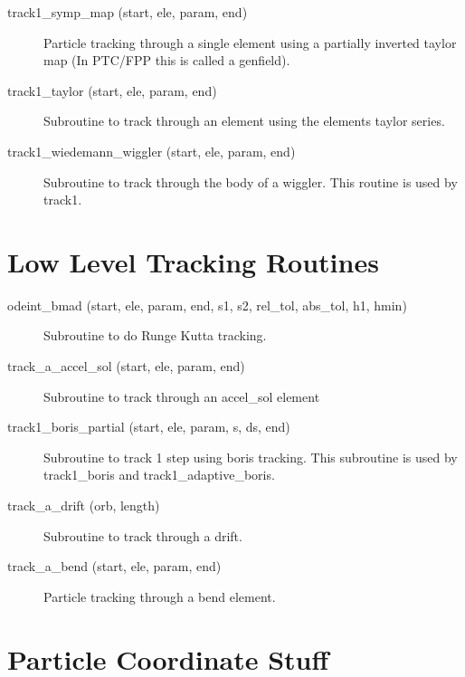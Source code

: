 \begin{description}
\item[track1\_symp\_map (start, ele, param, end)] \Newline
Particle tracking through a single element using a partially inverted taylor map (In PTC/FPP this is called a genfield). 

\item[track1\_taylor (start, ele, param, end)] \Newline
Subroutine to track through an element using the elements taylor series. 

\item[track1\_wiedemann\_wiggler (start, ele, param, end)] \Newline
Subroutine to track through the body of a wiggler. This routine is used by track1. 

\end{description}

\section{Low Level Tracking Routines}
\label{r:low_track}

\begin{description}

\item[odeint\_bmad (start, ele, param, end, s1, s2, rel\_tol, abs\_tol, h1, hmin)] \Newline
Subroutine to do Runge Kutta tracking. 

\item[track\_a\_accel\_sol (start, ele, param, end)] \Newline
Subroutine to track through an accel\_sol element 

\item[track1\_boris\_partial (start, ele, param, s, ds, end)] \Newline
Subroutine to track 1 step using boris tracking. This subroutine is used by track1\_boris and track1\_adaptive\_boris. 

\item[track\_a\_drift (orb, length)] \Newline
Subroutine to track through a drift. 

\item[track\_a\_bend (start, ele, param, end)] \Newline
Particle tracking through a bend element. 

\end{description}

\section{Particle Coordinate Stuff}
\label{r:coord}    

